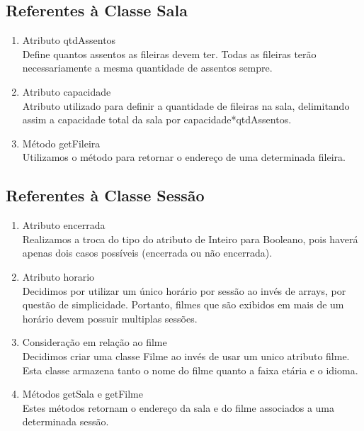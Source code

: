 \documentclass[a4paper]{article}
\begin{document}
\subsection{Referentes à Classe Sala}
\begin{enumerate}

\item{Atributo qtdAssentos}\\
Define quantos assentos as fileiras devem ter. Todas as fileiras terão necessariamente a mesma quantidade de assentos sempre.

\item{Atributo capacidade}\\
Atributo utilizado para definir a quantidade de fileiras na sala, delimitando assim a capacidade total da sala por capacidade*qtdAssentos.

\item{Método getFileira}\\
Utilizamos o método para retornar o endereço de uma determinada fileira.

\end{enumerate}

\subsection{Referentes à Classe Sessão}
\begin{enumerate}  

\item{Atributo encerrada}\\
Realizamos a troca do tipo do atributo de Inteiro para Booleano, pois haverá apenas dois casos possíveis (encerrada ou não encerrada).

\item{Atributo horario}\\
Decidimos por utilizar um único horário por sessão ao invés de arrays, por questão de simplicidade. Portanto, filmes que são exibidos em mais de um horário devem possuir multiplas sessões.

\item{Consideração em relação ao filme}\\
Decidimos criar uma classe Filme ao invés de usar um unico atributo filme. Esta classe armazena tanto o nome do filme quanto a faixa etária e o idioma.

\item{Métodos getSala e getFilme}\\
Estes métodos retornam o endereço da sala e do filme associados a uma determinada sessão.

\end{enumerate}
\end{document}
